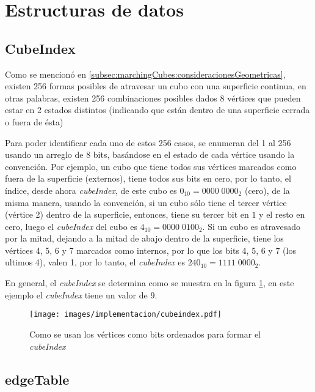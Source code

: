 \section{Estructuras de datos}
\label{ch:implementacion:sec:estructurasDeDatos}

\subsection{CubeIndex}
\label{ch:implementacion:sec:CubeIndex}

Como se mencionó en \ref{subsec:marchingCubes:consideracionesGeometricas}, existen 256 formas posibles de atravesar un cubo con una superficie continua, en otras palabras, existen 256 combinaciones posibles dados 8 vértices que pueden estar en 2 estados distintos (indicando que están dentro de una superficie cerrada o fuera de ésta)

Para poder identificar cada uno de estos 256 casos, se enumeran del 1 al 256 usando un arreglo de 8 bits, basándose en el estado de cada vértice usando la convención. Por ejemplo, un cubo que tiene todos sus vértices marcados como fuera de la superficie (externos), tiene todos sus bits en cero, por lo tanto, el índice, desde ahora \emph{cubeIndex}, de este cubo es \hbox{$0_{10} = 0000 \; 0000_{2}$} (cero), de la misma manera, usando la convención, si un cubo sólo tiene el tercer vértice (vértice 2) dentro de la superficie, entonces, tiene su tercer bit en $1$ y el resto en cero, luego el \emph{cubeIndex} del cubo es $4_{10} = 0000 \; 0100_{2}$. Si un cubo es atravesado por la mitad, dejando a la mitad de abajo dentro de la superficie, tiene los vértices 4, 5, 6 y 7 marcados como internos, por lo que los bits 4, 5, 6 y 7 (los ultimos 4), valen 1, por lo tanto, el \emph{cubeIndex} es $240_{10} = 1111 \; 0000_{2}$.

En general, el \emph{cubeIndex} se determina como se muestra en la figura \ref{f:ch:implementacion:sec:CubeIndex:cubeindex:cubeindex}, en este ejemplo el \emph{cubeIndex} tiene un valor de $9$.

\begin{figure}[hbt]
	\centering
	\fbox
	{
		\texttt{[image: images/implementacion/cubeindex.pdf]}
	}
	\caption{Como se usan los vértices como bits ordenados para formar el \emph{cubeIndex}}
	\label{f:ch:implementacion:sec:CubeIndex:cubeindex:cubeindex}
\end{figure}

\subsection{edgeTable}
\label{ch:implementacion:sec:edgeTable}


